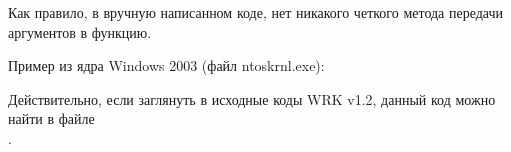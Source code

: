 \par
Как правило, в вручную написанном коде, нет никакого четкого метода передачи аргументов в функцию.

\par
Пример из ядра Windows 2003 
(файл ntoskrnl.exe):



Действительно, если заглянуть в исходные коды 
\ac{WRK} v1.2, данный код можно найти в файле \\
.
